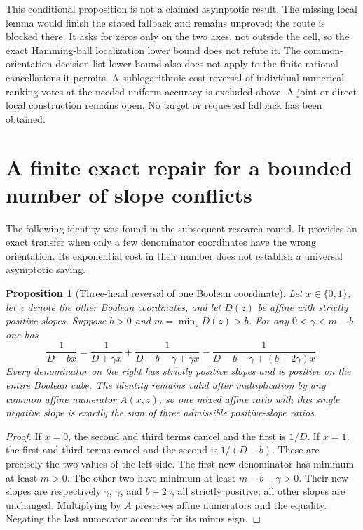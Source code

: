 \documentclass[11pt]{article}
\newtheorem{proposition}{Proposition}
\begin{document}
This conditional proposition is not a claimed asymptotic result.
The missing local lemma would finish the stated fallback and remains
unproved; the route is blocked there. It asks for zeros only on the
two axes, not outside the cell, so the exact Hamming-ball localization
lower bound does not refute it. The common-orientation decision-list
lower bound also does not apply to the finite rational cancellations
it permits. A sublogarithmic-cost reversal of individual numerical
ranking votes at the needed uniform accuracy is excluded above.
A joint or direct local construction remains open. No target or
requested fallback has been obtained.

\section{A finite exact repair for a bounded number of slope conflicts}

The following identity was found in the subsequent research round. It
provides an exact transfer when only a few denominator coordinates have
the wrong orientation. Its exponential cost in their number does not
establish a universal asymptotic saving.

\begin{proposition}[Three-head reversal of one Boolean coordinate]
Let $x\in\{0,1\}$, let $z$ denote the other Boolean coordinates, and let
$D(z)$ be affine with strictly positive slopes. Suppose $b>0$ and
$m=\min_z D(z)>b$. For any $0<\gamma<m-b$, one has
\[
 \frac1{D-bx}
 =\frac1{D+\gamma x}
  +\frac1{D-b-\gamma+\gamma x}
  -\frac1{D-b-\gamma+(b+2\gamma)x}.
\]
Every denominator on the right has strictly positive slopes and is
positive on the entire Boolean cube. The identity remains valid after
multiplication by any common affine numerator $A(x,z)$, so one mixed
affine ratio with this single negative slope is exactly the sum of three
admissible positive-slope ratios.
\end{proposition}
\begin{proof}
If $x=0$, the second and third terms cancel and the first is $1/D$.
If $x=1$, the first and third terms cancel and the second is $1/(D-b)$.
These are precisely the two values of the left side. The first new
denominator has minimum at least $m>0$. The other two have minimum
at least $m-b-\gamma>0$. Their new slopes are respectively
$\gamma$, $\gamma$, and $b+2\gamma$, all strictly positive;
all other slopes are unchanged. Multiplying by $A$ preserves affine
numerators and the equality. Negating the last numerator accounts for
its minus sign.
\end{proof}
\end{document}
